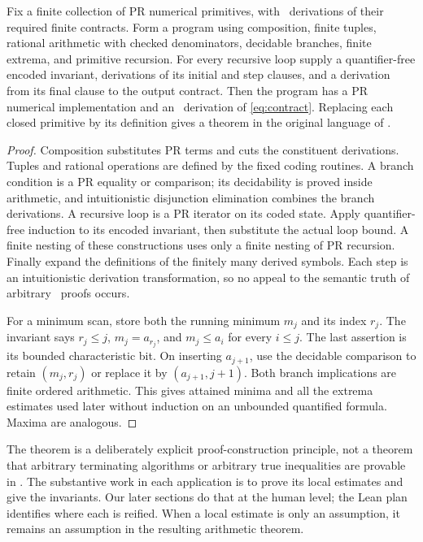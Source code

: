 \begin{theorem}\label{thm:realization}
Fix a finite collection of PR numerical primitives, with \ipra\ derivations of their required finite contracts. Form a program using composition, finite tuples, rational arithmetic with checked denominators, decidable branches, finite extrema, and primitive recursion. For every recursive loop supply a quantifier-free encoded invariant, derivations of its initial and step clauses, and a derivation from its final clause to the output contract. Then the program has a PR numerical implementation and an \ipra\ derivation of \eqref{eq:contract}. Replacing each closed primitive by its definition gives a theorem in the original language of \ipra.
\end{theorem}

\begin{proof}
Composition substitutes PR terms and cuts the constituent derivations. Tuples and rational operations are defined by the fixed coding routines. A branch condition is a PR equality or comparison; its decidability is proved inside arithmetic, and intuitionistic disjunction elimination combines the branch derivations. A recursive loop is a PR iterator on its coded state. Apply quantifier-free induction to its encoded invariant, then substitute the actual loop bound. A finite nesting of these constructions uses only a finite nesting of PR recursion. Finally expand the definitions of the finitely many derived symbols. Each step is an intuitionistic derivation transformation, so no appeal to the semantic truth of arbitrary \ipra\ proofs occurs.

For a minimum scan, store both the running minimum \(m_j\) and its index \(r_j\). The invariant says \(r_j\leq j\), \(m_j=a_{r_j}\), and \(m_j\leq a_i\) for every \(i\leq j\). The last assertion is its bounded characteristic bit. On inserting \(a_{j+1}\), use the decidable comparison to retain \((m_j,r_j)\) or replace it by \((a_{j+1},j+1)\). Both branch implications are finite ordered arithmetic. This gives attained minima and all the extrema estimates used later without induction on an unbounded quantified formula. Maxima are analogous.
\end{proof}

The theorem is a deliberately explicit proof-construction principle, not a theorem that arbitrary terminating algorithms or arbitrary true inequalities are provable in \ipra. The substantive work in each application is to prove its local estimates and give the invariants. Our later sections do that at the human level; the Lean plan identifies where each is reified. When a local estimate is only an assumption, it remains an assumption in the resulting arithmetic theorem.

